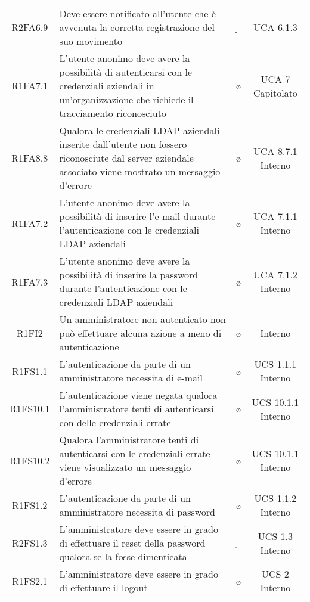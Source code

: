 {\begin{longtable}{ c C{8cm} c c}
R2FA6.9 & Deve essere notificato all’utente che è avvenuta la corretta registrazione del suo movimento & \d & UCA 6.1.3 \\


R1FA7.1 & L'utente anonimo deve avere la possibilità di autenticarsi con le credenziali aziendali in un'organizzazione che richiede il tracciamento riconosciuto & \o & UCA 7 Capitolato \\

R1FA8.8 & Qualora le credenziali LDAP aziendali inserite dall'utente non fossero riconosciute dal server aziendale associato viene mostrato un messaggio d'errore & \o & UCA 8.7.1 Interno \\

R1FA7.2 & L'utente anonimo deve avere la possibilità di inserire l'e-mail durante l'autenticazione con le credenziali LDAP aziendali & \o & UCA 7.1.1 Interno \\

R1FA7.3 & L'utente anonimo deve avere la possibilità di inserire la password durante l'autenticazione con le credenziali LDAP aziendali & \o & UCA 7.1.2 Interno \\

R1FI2 & Un amministratore non autenticato non può effettuare alcuna azione a meno di autenticazione & \o & Interno \\

R1FS1.1 & L’autenticazione da parte di un amministratore necessita di e-mail & \o & UCS 1.1.1 Interno\\

R1FS10.1 & L’autenticazione viene negata qualora l'amministratore tenti di autenticarsi con delle credenziali errate & \o & UCS 10.1.1 Interno \\

R1FS10.2 & Qualora l'amministratore tenti di autenticarsi con le credenziali errate viene visualizzato un messaggio d’errore & \o & UCS 10.1.1 Interno \\

R1FS1.2 & L’autenticazione da parte di un amministratore necessita di password & \o & UCS 1.1.2 Interno\\

R2FS1.3 & L'amministratore deve essere in grado di effettuare il reset della password qualora se la fosse dimenticata & \d & UCS 1.3 Interno\\

R1FS2.1 & L'amministratore deve essere in grado di effettuare il logout & \o & UCS 2 Interno\\


\end{longtable}}
